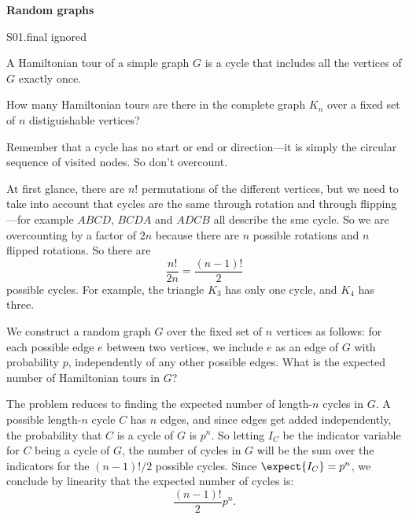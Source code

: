 \begin{problem}  {\bf Random graphs}
\begin{staffnotes}
S01.final ignored
\end{staffnotes}
A Hamiltonian tour of a simple graph $G$ is a cycle that includes all
the vertices of $G$ exactly once.

\bparts

\ppart
How many Hamiltonian tours are there in the complete graph $K_n$ over
a fixed set of $n$ distiguishable vertices?

\hint
Remember that a cycle has no start or end or direction---it is simply
the circular sequence of visited nodes.  So don't overcount.

\begin{solution}
At first glance, there are $n!$ permutations of the different
vertices, but we need to take into account that cycles are the same
through rotation and through flipping---for example $ABCD$, $BCDA$ and
$ADCB$ all describe the sme cycle.  So we are overcounting by a factor
of $2n$ because there are $n$ possible rotations and $n$ flipped
rotations.  So there are
\[
\frac{n!}{2n} = \frac{(n-1)!}{2}
\]
possible cycles.  For example, the triangle $K_3$ has only one cycle,
and $K_4$ has three.
\end{solution}

\ppart
We construct a random graph $G$ over the fixed set of $n$ vertices as
follows: for each possible edge $e$ between two vertices, we include
$e$ as an edge of $G$ with probability $p$, independently of any other
possible edges.  What is the expected number of Hamiltonian tours in
$G$?

\begin{solution}
The problem reduces to finding the expected number of length-$n$
cycles in $G$.  A possible length-$n$ cycle $C$ has $n$ edges, and
since edges get added independently, the probability that $C$ is a
cycle of $G$ is $p^n$.  So letting $I_C$ be the indicator variable for
$C$ being a cycle of $G$, the number of cycles in $G$ will be the sum
over the indicators for the $(n-1)!/2$ possible cycles.  Since
$\expect{I_C} = p^n$, we conclude by linearity that the
expected number of cycles is:
\[
\frac{(n-1)!}{2} p^n.
\]
\end{solution}

\eparts
\end{problem}

